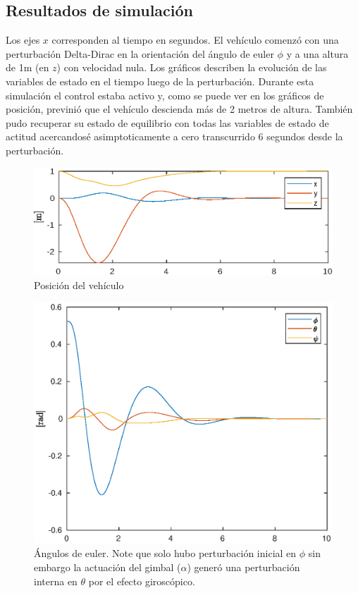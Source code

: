 \subsection{Resultados de simulación}

Los ejes $x$ corresponden al tiempo en segundos. El vehículo comenzó con una perturbación Delta-Dirac en la orientación del ángulo de euler $\phi$ y a una altura de 1m (en $z$) con velocidad nula. Los gráficos describen la evolución de las variables de estado en el tiempo luego de la perturbación. Durante esta simulación el control estaba activo y, como se puede ver en los gráficos de posición, previnió que el vehículo descienda más de 2 metros de altura. También pudo recuperar su estado de equilibrio con todas las variables de estado de actitud acercandosé asimptoticamente a cero transcurrido 6 segundos desde la perturbación.

\begin{figure}[!ht]
    \centering
    \includegraphics[width=0.8\linewidth]{fig/pos_edf}
    \caption{Posición del vehículo}
    \label{fig:pos_edf}
\end{figure}

\begin{figure}[!ht]
    \centering
    \includegraphics[width=0.6\linewidth]{fig/eulerang_edf}
    \caption{Ángulos de euler. Note que solo hubo perturbación inicial en $\phi$ sin embargo la actuación del gimbal ($\alpha$) generó una perturbación interna en $\theta$ por el efecto giroscópico.}
    \label{fig:eulerang_edf}
\end{figure}

